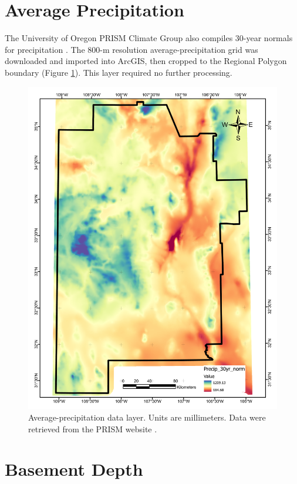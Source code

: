 \section{Average Precipitation}\label{app:dl_precip}

The University of Oregon PRISM Climate Group also compiles 30-year normals for precipitation \citep{daly_physiographically_2008, prism_prism_2021}. The 800-m resolution average-precipitation grid was downloaded and imported into ArcGIS, then cropped to the Regional Polygon boundary (Figure \ref{fig:feat_precip}). This layer required no further processing.

\begin{figure}[H]
\centering
\includegraphics[width=0.75\linewidth]{templates/images/Figure-AvgPrecip.pdf}
\caption[Average precipitation data layer]{Average-precipitation data layer. Units are millimeters. Data were retrieved from the PRISM website \protect\citep{prism_prism_2021}.}
\label{fig:feat_precip}
\end{figure}

\section{Basement Depth}\label{app:dl_basement_depth}

